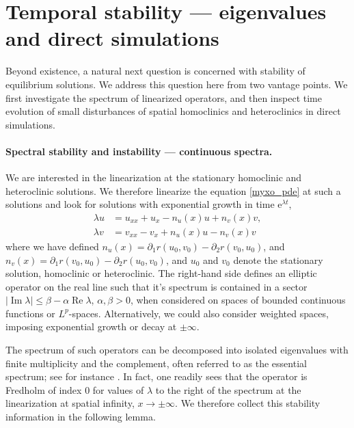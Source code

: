 \documentclass[10pt]{article}
\def\Re{\mathop{\mathrm{Re}}}
\def\Im{\mathop{\mathrm{Im}}}
\newcommand{\rme}{\mathrm{e}}
\renewcommand{\leq}{\leqslant}
\begin{document}
\section{Temporal stability --- eigenvalues and direct simulations}
\label{section:direct}
Beyond existence, a natural next question is concerned with stability of equilibrium solutions. We address this question here from two vantage points. We first investigate the spectrum of linearized operators, and then inspect time evolution of small disturbances of spatial homoclinics and heteroclinics in direct simulations.



\paragraph{Spectral stability and instability --- continuous spectra.}
We are interested in the linearization at the stationary homoclinic and heteroclinic solutions. We therefore linearize the equation  \eqref{myxo_pde} at such a solutions and look for solutions with exponential growth in time $\rme^{\lambda t}$, 
\begin{equation}
\begin{aligned}
\lambda u &=  u_{xx} + u_x - n_u(x) u + n_v(x) v,\\
\lambda v &= v_{xx} - v_x + n_u(x) u - n_v(x) v
\label{eig_prob}
\end{aligned}%
\end{equation}
where we have defined $n_u(x) = \partial_1 r(u_0,v_0) - \partial_2 r(v_0,u_0)$, and $n_v(x)=\partial_1 r(v_0,u_0) - \partial_2 r(u_0,v_0)$, and $u_0$ and $v_0$ denote the stationary solution, homoclinic or heteroclinic. The right-hand side defines an elliptic operator on the real line such that it's spectrum is contained in a sector $|\Im\lambda|\leq \beta -\alpha \Re\lambda$, $\alpha,\beta>0$, when considered on spaces of bounded continuous functions or $L^p$-spaces. Alternatively, we could also consider weighted spaces, imposing exponential growth or decay at $\pm\infty$. 

The spectrum of such operators can be decomposed into isolated eigenvalues with finite multiplicity and the complement, often referred to as the essential spectrum; see for instance \cite{fs}. In fact, one readily sees that the operator is Fredholm of index 0 for values of $\lambda$ to the right of the spectrum at the linearization at spatial infinity, $x\to\pm\infty$. We therefore collect this stability information in the following lemma. 
\end{document}
